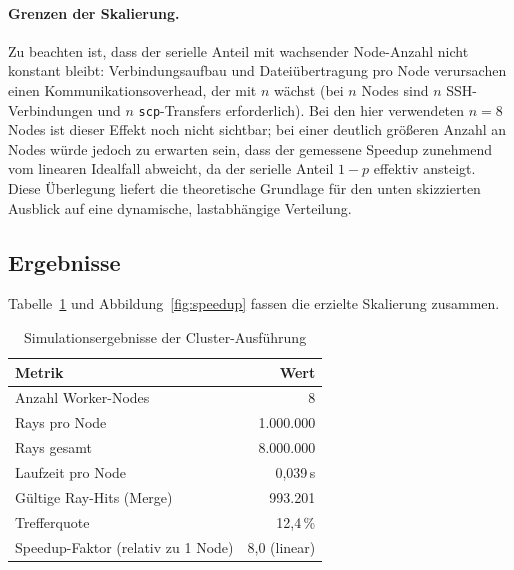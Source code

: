 \paragraph{Grenzen der Skalierung.}
Zu beachten ist, dass der serielle Anteil mit wachsender Node-Anzahl nicht
konstant bleibt: Verbindungsaufbau und Dateiübertragung pro Node
verursachen einen Kommunikationsoverhead, der mit $n$ wächst
(bei $n$ Nodes sind $n$ SSH-Verbindungen und $n$ \texttt{scp}-Transfers
erforderlich). Bei den hier verwendeten $n=8$ Nodes ist dieser Effekt noch
nicht sichtbar; bei einer deutlich größeren Anzahl an Nodes würde jedoch
zu erwarten sein, dass der gemessene Speedup zunehmend vom linearen
Idealfall abweicht, da der serielle Anteil $1-p$ effektiv ansteigt. Diese
Überlegung liefert die theoretische Grundlage für den unten skizzierten
Ausblick auf eine dynamische, lastabhängige Verteilung.

\subsection{Ergebnisse}

Tabelle~\ref{tab:results} und Abbildung~\ref{fig:speedup} fassen die
erzielte Skalierung zusammen.

\begin{table}[htbp]
    \centering
    \caption{Simulationsergebnisse der Cluster-Ausführung}
    \label{tab:results}
    \begin{tabular}{lr}
        \toprule
        Metrik & Wert \\
        \midrule
        Anzahl Worker-Nodes & 8 \\
        Rays pro Node & 1.000.000 \\
        Rays gesamt & 8.000.000 \\
        Laufzeit pro Node & 0{,}039\,s \\
        Gültige Ray-Hits (Merge) & 993.201 \\
        Trefferquote & 12{,}4\,\% \\
        Speedup-Faktor (relativ zu 1 Node) & 8{,}0 (linear) \\
        \bottomrule
    \end{tabular}
\end{table}

